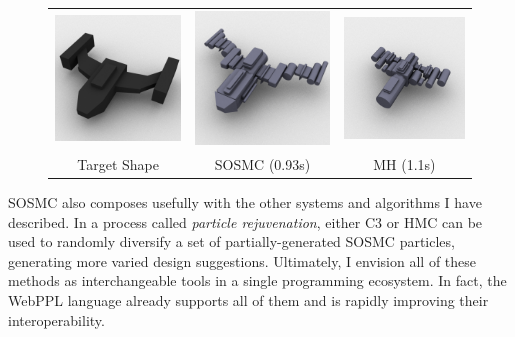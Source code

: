 \documentclass[
10pt, %
a4paper, %
oneside, %
headinclude,footinclude, %
BCOR5mm, %
]{scrartcl}
\newcommand*{\helvetica}{\fontfamily{phv}\selectfont}
\begin{document}
\vspace{1em}
\begin{figure}[h!]
	\centering
	\begin{tabular}{ccc}
		\includegraphics[width=0.30\linewidth]{figs/sosmc/target.png} &
		\includegraphics[width=0.30\linewidth]{figs/sosmc/sosmc.png} &
		\includegraphics[width=0.30\linewidth]{figs/sosmc/mh.png} \\
		{\helvetica \scriptsize{Target Shape}} & {\helvetica \scriptsize{SOSMC (0.93s)}} & {\helvetica \scriptsize{MH (1.1s)}}
	\end{tabular}
\end{figure}

SOSMC also composes usefully with the other systems and algorithms I have described. In a process called \emph{particle rejuvenation}, either C3 or HMC can be used to randomly diversify a set of partially-generated SOSMC particles, generating more varied design suggestions. Ultimately, I envision all of these methods as interchangeable tools in a single programming ecosystem. In fact, the WebPPL language already supports all of them and is rapidly improving their interoperability.


\end{document}
